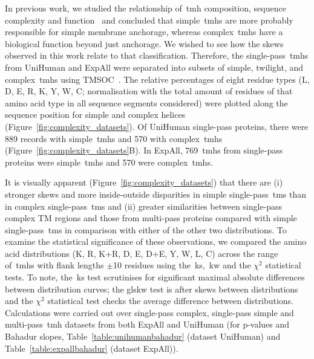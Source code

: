 In previous work, we studied the relationship of~\gls{tmh} composition, sequence complexity and function~\cite{Wong2010, Wong2011, Wong2012} and concluded that simple~\gls{tmh}s are more probably responsible for simple membrane anchorage, whereas complex~\gls{tmh}s have a biological function beyond just anchorage.
We wished to see how the skews observed in this work relate to that classification.
Therefore, the single\--pass~\gls{tmh}s from UniHuman and ExpAll were separated into subsets of simple, twilight, and complex~\gls{tmh}s using TMSOC~\cite{Wong2011, Wong2012}.
The relative percentages of eight residue types (L, D, E, R, K, Y, W, C\@; normalisation with the total amount of residues of that amino acid type in all sequence segments considered) were plotted along the sequence position for simple and complex helices (Figure~\ref{fig:complexity_datasets}).
Of UniHuman single\--pass proteins, there were 889 records with simple~\gls{tmh}s and 570 with complex~\gls{tmh}s (Figure~\ref{fig:complexity_datasets}B).
In ExpAll, 769~\gls{tmh}s from single\--pass proteins were simple~\gls{tmh}s and 570 were complex~\gls{tmh}s.

It is visually apparent (Figure~\ref{fig:complexity_datasets}) that there are (i) stronger skews and more inside-outside disparities in simple single\--pass~\gls{tm}s than in complex single\--pass~\gls{tm}s and (ii) greater similarities between single\--pass complex TM regions and those from multi\--pass proteins compared with simple single\--pass~\gls{tm}s in comparison with either of the other two distributions.
To examine the statistical significance of these observations, we compared the amino acid distributions (K, R, K+R, D, E, D+E, Y, W, L, C) across the range of~\gls{tmh}s with flank lengths $\pm$10 residues using the~\gls{ks},~\gls{kw} and the \({\chi}^{2}\) statistical tests.
To note, the~\gls{ks} test scrutinises for significant maximal absolute differences between distribution curves; the gls{kw} test is after skews between distributions and the \({\chi}^{2}\) statistical test checks the average difference between distributions.
Calculations were carried out over single\--pass complex, single\--pass simple and multi\--pass~\gls{tmh} datasets from both ExpAll and UniHuman (for p\--values and Bahadur slopes, Table~\ref{table:unihumanbahadur} (dataset UniHuman) and Table~\ref{table:expallbahadur} (dataset ExpAll)).

